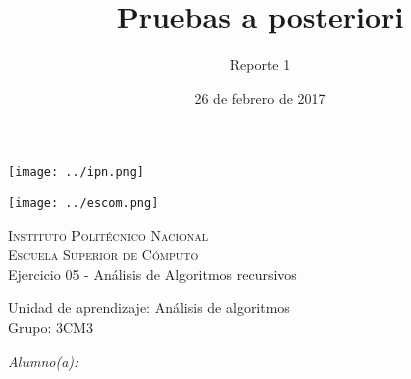 \documentclass[12pt]{article}
\date{26 de febrero de 2017}
\title{Pruebas a posteriori}
\author{Reporte 1}
\begin{document}
\begin{titlepage}
            \begin{center}
                \noindent
                \begin{minipage}{0.5\textwidth}
                    \begin{flushleft} \large
                        \texttt{[image: ../ipn.png]}
                    \end{flushleft}
                \end{minipage}%
                \begin{minipage}{0.55\textwidth}
                    \begin{flushright} \large
                        \texttt{[image: ../escom.png]}
                    \end{flushright}
                \end{minipage}
                
                \textsc{\LARGE Instituto Politécnico Nacional}\\[0.5cm]
                
                \textsc{\Large Escuela Superior de Cómputo}\\[1cm]
                
                
                { \huge Ejercicio 05 - Análisis de Algoritmos recursivos  \\[1cm] }
                
                { \Large Unidad de aprendizaje: Análisis de algoritmos} \\[1cm]
                
                { \Large Grupo: 3CM3 } \\[1cm]
                
                \noindent
                \begin{minipage}{0.5\textwidth}
                    \begin{flushleft} \large
                        \emph{Alumno(a):}\\
                        

\end{flushleft}
\end{minipage}
\end{center}
\end{titlepage}
\end{document}
